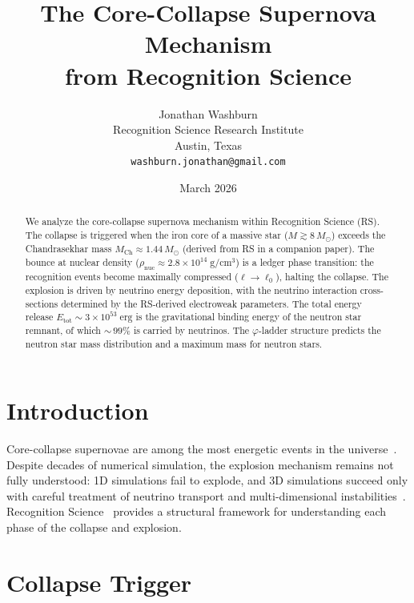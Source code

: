 \documentclass[12pt,a4paper]{article}
\title{The Core-Collapse Supernova Mechanism\\from Recognition Science}
\author{Jonathan Washburn\\
Recognition Science Research Institute\\
Austin, Texas\\
\texttt{washburn.jonathan@gmail.com}}
\date{March 2026}
\theoremstyle{definition}
\theoremstyle{remark}
\begin{document}
\maketitle

\begin{abstract}
We analyze the core-collapse supernova mechanism within Recognition
Science (RS).  The collapse is triggered when the iron core of a
massive star ($M \gtrsim 8\,M_\odot$) exceeds the Chandrasekhar mass
$M_{\mathrm{Ch}} \approx 1.44\,M_\odot$ (derived from RS in a
companion paper).  The bounce at nuclear density
($\rho_{\mathrm{nuc}} \approx 2.8 \times 10^{14}\;\mathrm{g/cm^3}$)
is a ledger phase transition: the recognition events become maximally
compressed ($\ell \to \ell_0$), halting the collapse.  The explosion
is driven by neutrino energy deposition, with the neutrino
interaction cross-sections determined by the RS-derived electroweak
parameters.  The total energy release $E_{\mathrm{tot}} \sim
3 \times 10^{53}\;\mathrm{erg}$ is the gravitational binding energy
of the neutron star remnant, of which ${\sim}\,99\%$ is carried by
neutrinos.  The $\varphi$-ladder structure predicts the neutron star
mass distribution and a maximum mass for neutron stars.
\end{abstract}

\section{Introduction}
\label{sec:intro}

Core-collapse supernovae are among the most energetic events in the
universe~\cite{Janka2012}.  Despite decades of numerical simulation,
the explosion mechanism remains not fully understood: 1D simulations
fail to explode, and 3D simulations succeed only with careful
treatment of neutrino transport and multi-dimensional
instabilities~\cite{Burrows2021}.  Recognition Science~\cite{RS_Axioms}
provides a structural framework for understanding each phase of the
collapse and explosion.

\section{Collapse Trigger}
\label{sec:trigger}
\end{document}
